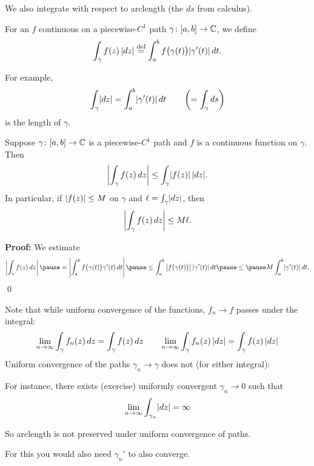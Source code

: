 \documentclass[10pt,aspectratio=169]{beamer}
\begin{document}
\begin{frame}
We also integrate with respect to arclength (the $ds$ from calculus).

\medskip
\pause

For an $f$ continuous on a piecewise-$C^1$ path $\gamma \colon [a,b] \to {\mathbb{C}}$,
we define
\[
\int_\gamma f(z) \, \lvert {dz} \rvert
\overset{\text{def}}{=}
\int_a^b f\bigl( \gamma(t) \bigr) \lvert {\gamma'(t)} \rvert \, dt .
\]

\pause

For example,
\[
\int_\gamma \lvert {dz} \rvert =
\int_a^b \lvert {\gamma'(t)} \rvert \, dt
\qquad
\left(
=
\int_\gamma ds \right)
\]
is the length of $\gamma$.
\end{frame}

\begin{frame}
\begin{proposition}
Suppose $\gamma \colon [a,b] \to {\mathbb{C}}$ is 
a piecewise-$C^1$ path and $f$ is a continuous function on
$\gamma$.  Then
\begin{equation*}
\left\lvert {\int_\gamma f(z) \, dz} \right\rvert \leq \int_\gamma \lvert {f(z)} \rvert \, \lvert {dz} \rvert .
\end{equation*}
\pause
In particular, if $\lvert {f(z)} \rvert \leq M$ on $\gamma$ and $\ell = \int_{\gamma} \lvert {dz} \rvert$, then
\begin{equation*}
\left\lvert {\int_\gamma f(z) \, dz} \right\rvert \leq M \ell .
\end{equation*}
\end{proposition} 
\pause

\textbf{Proof:}
We estimate
\[
\abs{\int_\gamma f(z) \, dz}
\pause
=
\abs{\int_a^b f\bigl( \gamma(t) \bigr) \gamma'(t) \, dt}
\pause
\leq
\int_a^b \abs{ f\bigl( \gamma(t) \bigr) }  \sabs{ \gamma'(t) } \, dt
\pause
\leq
\pause
M
\int_a^b \sabs{ \gamma'(t) } \, dt .
\]
\qed
\end{frame}

\begin{frame}
Note that while uniform convergence of the functions, $f_n \to f$ passes under the
integral:
\[
\lim_{n\to\infty} \int_{\gamma} f_n(z) \, dz
=
\int_{\gamma} f(z) \, dz
\qquad
\lim_{n\to\infty} \int_{\gamma} f_n(z) \, \lvert {dz} \rvert
=
\int_{\gamma} f(z) \, \lvert {dz} \rvert
\]
\pause
Uniform convergence of the paths $\gamma_n \to \gamma$ does not (for either
integral):

\pause
\medskip
For instance, there exists (exercise) uniformly convergent $\gamma_n \to 0$ such that
\[
\lim_{n\to\infty} \int_{\gamma_n} \lvert {dz} \rvert = \infty
\]

\pause

So arclength is not preserved under uniform convergence of paths.

\medskip
\pause

For this you would also need $\gamma_n'$ to also converge.
\end{frame}
\end{document}
